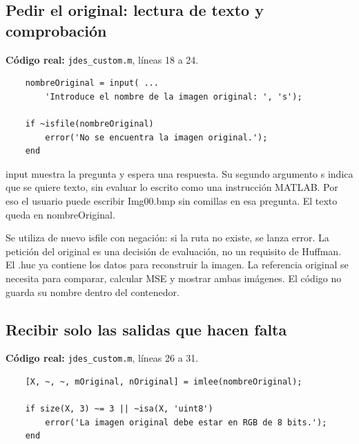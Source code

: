 \documentclass[11pt,a4paper,oneside]{report}
\begin{document}
\par\medskip\noindent\begin{minipage}{\linewidth}

\subsection{Pedir el original: lectura de texto y comprobación}

\textbf{Código real:} \texttt{jdes\_custom.m}, líneas 18 a 24.

\begin{lstlisting}[firstnumber=18]
    % PASO 2: obtener la imagen original para la comparacion.
    nombreOriginal = input( ...
        'Introduce el nombre de la imagen original: ', 's');

    if ~isfile(nombreOriginal)
        error('No se encuentra la imagen original.');
    end
\end{lstlisting}

\end{minipage}\par


input muestra la pregunta y espera una respuesta. Su segundo argumento s
indica que se quiere texto, sin evaluar lo escrito como una instrucción MATLAB.
Por eso el usuario puede escribir Img00.bmp sin comillas en esa pregunta.
El texto queda en nombreOriginal.

Se utiliza de nuevo isfile con negación: si la ruta no existe, se lanza error.
La petición del original es una decisión de evaluación, no un requisito de
Huffman. El .huc ya contiene los datos para reconstruir la imagen. La referencia
original se necesita para comparar, calcular MSE y mostrar ambas imágenes.
El código no guarda su nombre dentro del contenedor.


\par\medskip\noindent\begin{minipage}{\linewidth}

\subsection{Recibir solo las salidas que hacen falta}

\textbf{Código real:} \texttt{jdes\_custom.m}, líneas 26 a 31.

\begin{lstlisting}[firstnumber=26]
    % Leer la imagen original en RGB.
    [X, ~, ~, mOriginal, nOriginal] = imlee(nombreOriginal);

    if size(X, 3) ~= 3 || ~isa(X, 'uint8')
        error('La imagen original debe estar en RGB de 8 bits.');
    end
\end{lstlisting}

\end{minipage}\par
\end{document}
